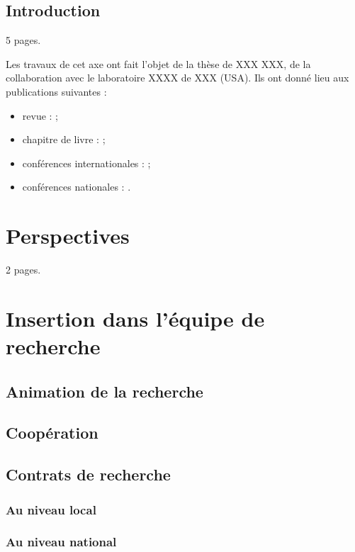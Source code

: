 \documentclass[french]{hdrapplication}
\begin{document}

\subsection{Introduction}

5 pages.

Les travaux de cet axe ont fait l'objet de la thèse de XXX XXX, de la collaboration avec le laboratoire XXXX de XXX (USA). Ils ont donné lieu aux publications suivantes :
\begin{itemize}
\item revue : ;
\item chapitre de livre : ;
\item conférences internationales : ;
\item conférences nationales : .
\end{itemize}

\section{Perspectives}

2 pages.

\section{Insertion dans l'équipe de recherche}

\subsection{Animation de la recherche}

\subsection{Coopération}

\subsection{Contrats de recherche}

\subsubsection{Au niveau local}

\subsubsection{Au niveau national}
\end{document}
